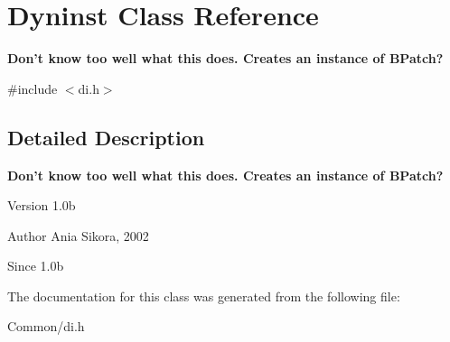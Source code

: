 \hypertarget{class_dyninst}{\section{Dyninst Class Reference}
\label{class_dyninst}
}


{\bfseries Don't know too well what this does. Creates an instance of B\-Patch?}  




{\ttfamily \#include $<$di.\-h$>$}



\subsection{Detailed Description}
{\bfseries Don't know too well what this does. Creates an instance of B\-Patch?} 

\begin{DoxyVersion}{Version}
1.\-0b 
\end{DoxyVersion}
\begin{DoxyAuthor}{Author}
Ania Sikora, 2002 
\end{DoxyAuthor}
\begin{DoxySince}{Since}
1.\-0b 
\end{DoxySince}


The documentation for this class was generated from the following file\-:\begin{DoxyCompactItemize}
\item 
Common/di.\-h\end{DoxyCompactItemize}
